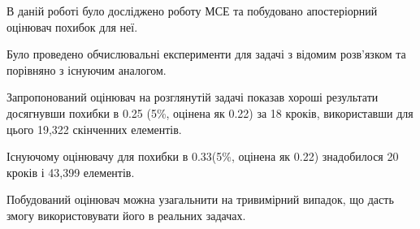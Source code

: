 

В даній роботі було досліджено роботу МСЕ та побудовано апостеріорний оцінювач похибок для неї.

Було проведено обчислювальні експерименти для задачі з відомим розв'язком та порівняно з існуючим аналогом.

Запропонований оцінювач на розглянутій задачі показав хороші результати досягнувши похибки в 0.25 (5\%, оцінена як 0.22)  за 18 кроків, використавши для цього 19,322 скінченних елементів.

Існуючому оцінювачу для похибки в 0.33(5\%, оцінена як 0.22) знадобилося 20 кроків і 43,399 елементів.

Побудований оцінювач можна узагальнити на тривимірний випадок, що дасть змогу використовувати його в реальних задачах.
